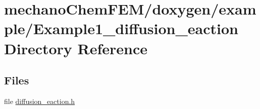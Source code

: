 \section{mechano\+Chem\+F\+E\+M/doxygen/example/\+Example1\+\_\+diffusion\+\_\+eaction Directory Reference}
\label{dir_c4307ac65a8e862775da89ab360bdb6e}
\subsection*{Files}
\begin{DoxyCompactItemize}
\item 
file \mbox{\hyperlink{diffusion__eaction_8h}{diffusion\+\_\+eaction.\+h}}
\end{DoxyCompactItemize}
